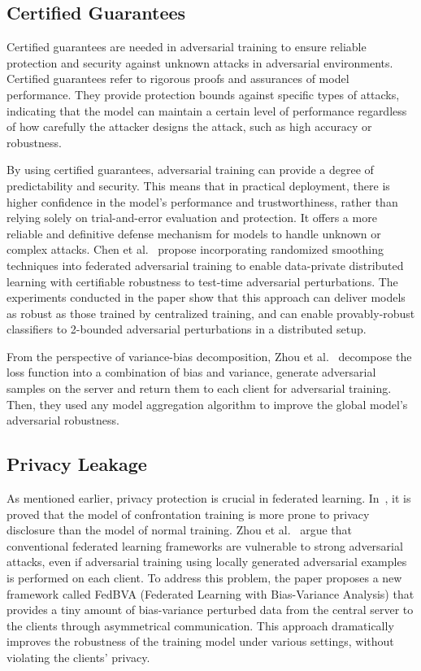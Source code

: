 \subsection{Certified Guarantees}  
Certified guarantees are needed in adversarial training
to ensure reliable protection and security against unknown
attacks in adversarial environments. Certified guarantees
refer to rigorous proofs and assurances of model
performance. They provide protection bounds against specific
types of attacks, indicating that the model can maintain
a certain level of performance regardless of how carefully
the attacker designs the attack, such as high accuracy or
robustness.

By using certified guarantees, adversarial training can
provide a degree of predictability and security. This means
that in practical deployment, there is higher confidence in
the model's performance and trustworthiness, rather than
relying solely on trial-and-error evaluation and protection.
It offers a more reliable and definitive defense mechanism
for models to handle unknown or complex attacks.
Chen et al.~\cite{chen2021certifiably} propose incorporating randomized
smoothing techniques into federated adversarial training
to enable data-private distributed learning with
certifiable robustness to test-time adversarial perturbations.
The experiments conducted in the paper show that this
approach can deliver models as robust as those trained
by centralized training, and can enable provably-robust
classifiers to 2-bounded adversarial perturbations in a
distributed setup. 

From the perspective of variance-bias decomposition,
Zhou et al.~\cite{zhou2022adversarial} decompose the loss function into a
combination of bias and variance, generate adversarial
samples on the server and return them to each client for
adversarial training. Then, they used any model
aggregation algorithm to improve the global model's adversarial robustness.  

\subsection{Privacy Leakage}  
As mentioned earlier, privacy protection is crucial in
federated learning. In~\cite{zhang2022privacy}, it is proved that the model of
confrontation training is more prone to privacy disclosure
than the model of normal training. Zhou et al.~\cite{zhou2020adversarially} 
argue that conventional federated learning frameworks are
vulnerable to strong adversarial attacks, even if adversarial
training using locally generated adversarial examples is
performed on each client. To address this problem, the
paper proposes a new framework called FedBVA (Federated
Learning with Bias-Variance Analysis) that provides a tiny
amount of bias-variance perturbed data from the central
server to the clients through asymmetrical communication.
This approach dramatically improves the robustness of the 
training model under various settings, without violating
the clients' privacy.

